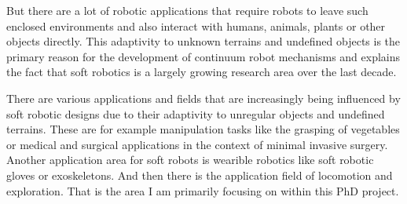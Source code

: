 But there are a lot of robotic applications that require robots to leave such enclosed environments and also interact with humans, animals, plants or other objects directly.
 This adaptivity to unknown terrains and undefined objects is the primary reason for the development of continuum robot mechanisms and explains the fact
  that soft robotics is a largely growing research area over the last decade. \par
% 
There are various applications and fields that are increasingly being influenced by soft robotic designs due to their adaptivity to unregular objects and undefined terrains. 
These are for example manipulation tasks like the grasping of vegetables or medical and surgical applications in the context of minimal invasive surgery. Another application area
for soft robots is wearible robotics like soft robotic gloves or exoskeletons. And then there is the application field of locomotion and exploration. That is the area I am primarily 
focusing on within this PhD project.
\par
%
